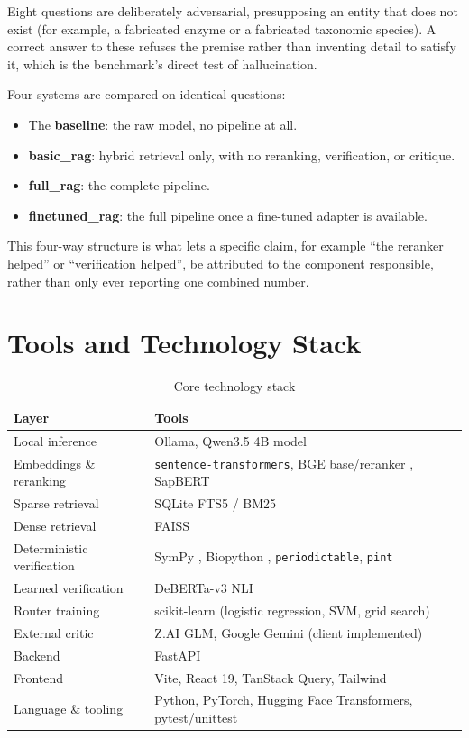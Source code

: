 Eight questions are deliberately adversarial, presupposing an entity that
does not exist (for example, a fabricated enzyme or a fabricated
taxonomic species). A correct answer to these refuses the premise rather
than inventing detail to satisfy it, which is the benchmark's direct test
of hallucination.

Four systems are compared on identical questions:

\begin{itemize}
\item The \textbf{baseline}: the raw model, no pipeline at all.
\item \textbf{basic\_rag}: hybrid retrieval only, with no reranking,
verification, or critique.
\item \textbf{full\_rag}: the complete pipeline.
\item \textbf{finetuned\_rag}: the full pipeline once a fine-tuned
adapter is available.
\end{itemize}

This four-way structure is what lets a specific claim, for example
``the reranker helped'' or ``verification helped'', be attributed to the
component responsible, rather than only ever reporting one combined
number.

\section{Tools and Technology Stack}\label{3.9}

\begin{table}[h]
\centering
\caption{Core technology stack}
\label{tab:3.3}
\footnotesize
\begin{tabularx}{\textwidth}{@{}lX@{}}
\toprule
\textbf{Layer} & \textbf{Tools} \\
\midrule
Local inference & Ollama, Qwen3.5 4B model \cite{qwen2023technical} \\
Embeddings \& reranking & \texttt{sentence-transformers}, BGE base/reranker \cite{xiao2023bge}, SapBERT \cite{liu2021sapbert} \\
Sparse retrieval & SQLite FTS5 / BM25 \cite{robertson2009bm25} \\
Dense retrieval & FAISS \cite{johnson2019faiss} \\
Deterministic verification & SymPy \cite{meurer2017sympy}, Biopython \cite{cock2009biopython}, \texttt{periodictable}, \texttt{pint} \\
Learned verification & DeBERTa-v3 NLI \cite{he2021deberta} \\
Router training & scikit-learn (logistic regression, SVM, grid search) \\
External critic & Z.AI GLM, Google Gemini (client implemented) \\
Backend & FastAPI \\
Frontend & Vite, React 19, TanStack Query, Tailwind \\
Language \& tooling & Python, PyTorch, Hugging Face Transformers, pytest/unittest \\
\bottomrule
\end{tabularx}
\end{table}

